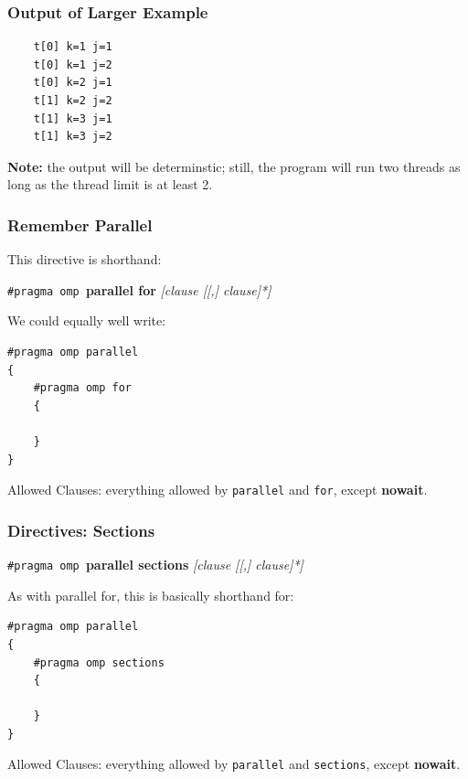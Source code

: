 \begin{frame}[fragile]
\frametitle{Output of Larger Example}

\begin{lstlisting}
    t[0] k=1 j=1
    t[0] k=1 j=2
    t[0] k=2 j=1
    t[1] k=2 j=2
    t[1] k=3 j=1
    t[1] k=3 j=2
  \end{lstlisting}

{\bf Note:} the output will be determinstic; still, the program will run two threads as long as the thread limit is at least 2.


\end{frame}


\begin{frame}[fragile]
\frametitle{Remember Parallel}

This directive is shorthand:

  \begin{center}
    {\tt \#pragma omp }{\bf parallel for} {\it [clause [[,] clause]*]}
  \end{center}

We could equally well write:

  \begin{lstlisting}
#pragma omp parallel
{
    #pragma omp for
    {

    }
}
  \end{lstlisting}


Allowed Clauses: everything allowed by {\tt parallel} and {\tt for}, except
  {\bf nowait}.



\end{frame}


\begin{frame}[fragile]
\frametitle{Directives: Sections}

 \begin{center}
    {\tt \#pragma omp }{\bf parallel sections} {\it [clause [[,] clause]*]}
  \end{center}

  As with parallel for, this is basically shorthand for:
  
  \begin{lstlisting}
#pragma omp parallel
{
    #pragma omp sections
    {

    }
}
  \end{lstlisting}

  Allowed Clauses: everything allowed by {\tt parallel} and {\tt sections}, except
  {\bf nowait}.


\end{frame}

